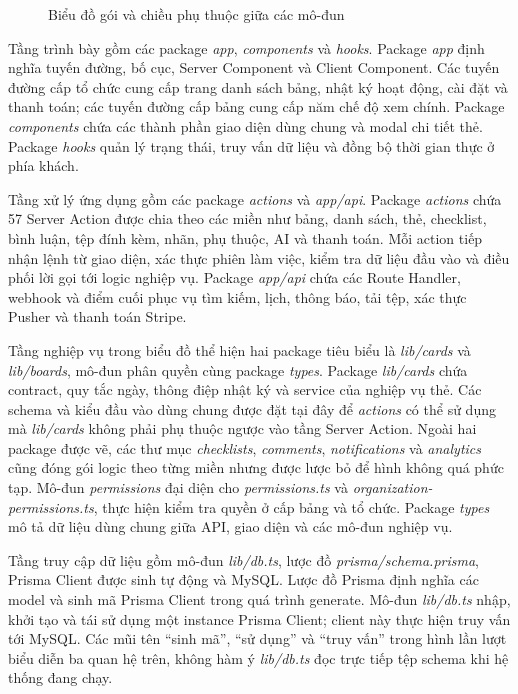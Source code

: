 \documentclass[../DoAn.tex]{subfiles}
\begin{document}
\begin{figure}[H]
    \centering
    \caption{Biểu đồ gói và chiều phụ thuộc giữa các mô-đun}
    \label{fig:chapter4_package_diagram}
\end{figure}

Tầng trình bày gồm các package \textit{app}, \textit{components} và \textit{hooks}. Package \textit{app} định nghĩa tuyến đường, bố cục, Server Component và Client Component. Các tuyến đường cấp tổ chức cung cấp trang danh sách bảng, nhật ký hoạt động, cài đặt và thanh toán; các tuyến đường cấp bảng cung cấp năm chế độ xem chính. Package \textit{components} chứa các thành phần giao diện dùng chung và modal chi tiết thẻ. Package \textit{hooks} quản lý trạng thái, truy vấn dữ liệu và đồng bộ thời gian thực ở phía khách.

Tầng xử lý ứng dụng gồm các package \textit{actions} và \textit{app/api}. Package \textit{actions} chứa 57 Server Action được chia theo các miền như bảng, danh sách, thẻ, checklist, bình luận, tệp đính kèm, nhãn, phụ thuộc, AI và thanh toán. Mỗi action tiếp nhận lệnh từ giao diện, xác thực phiên làm việc, kiểm tra dữ liệu đầu vào và điều phối lời gọi tới logic nghiệp vụ. Package \textit{app/api} chứa các Route Handler, webhook và điểm cuối phục vụ tìm kiếm, lịch, thông báo, tải tệp, xác thực Pusher và thanh toán Stripe.

Tầng nghiệp vụ trong biểu đồ thể hiện hai package tiêu biểu là \textit{lib/cards} và \textit{lib/boards}, mô-đun phân quyền cùng package \textit{types}. Package \textit{lib/cards} chứa contract, quy tắc ngày, thông điệp nhật ký và service của nghiệp vụ thẻ. Các schema và kiểu đầu vào dùng chung được đặt tại đây để \textit{actions} có thể sử dụng mà \textit{lib/cards} không phải phụ thuộc ngược vào tầng Server Action. Ngoài hai package được vẽ, các thư mục \textit{checklists}, \textit{comments}, \textit{notifications} và \textit{analytics} cũng đóng gói logic theo từng miền nhưng được lược bỏ để hình không quá phức tạp. Mô-đun \textit{permissions} đại diện cho \textit{permissions.ts} và \textit{organization-permissions.ts}, thực hiện kiểm tra quyền ở cấp bảng và tổ chức. Package \textit{types} mô tả dữ liệu dùng chung giữa API, giao diện và các mô-đun nghiệp vụ.

Tầng truy cập dữ liệu gồm mô-đun \textit{lib/db.ts}, lược đồ \textit{prisma/schema.prisma}, Prisma Client được sinh tự động và MySQL. Lược đồ Prisma định nghĩa các model và sinh mã Prisma Client trong quá trình generate. Mô-đun \textit{lib/db.ts} nhập, khởi tạo và tái sử dụng một instance Prisma Client; client này thực hiện truy vấn tới MySQL. Các mũi tên ``sinh mã'', ``sử dụng'' và ``truy vấn'' trong hình lần lượt biểu diễn ba quan hệ trên, không hàm ý \textit{lib/db.ts} đọc trực tiếp tệp schema khi hệ thống đang chạy.
\end{document}

